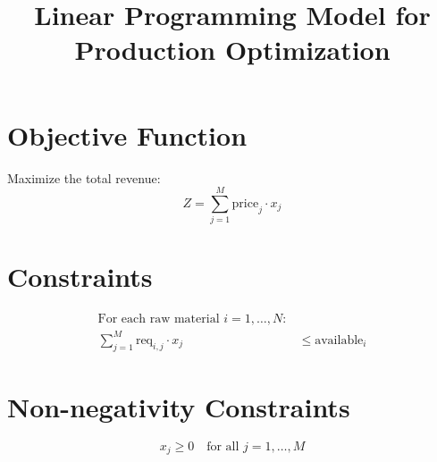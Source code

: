 \documentclass{article}
\begin{document}
\title{Linear Programming Model for Production Optimization}
\author{}
\date{}
\maketitle

\section*{Objective Function}
Maximize the total revenue:
\[
Z = \sum_{j=1}^{M} \text{price}_j \cdot x_j
\]

\section*{Constraints}
\begin{align*}
\text{For each raw material } i = 1, \ldots, N: \\
\sum_{j=1}^{M} \text{req}_{i,j} \cdot x_j &\leq \text{available}_i
\end{align*}

\section*{Non-negativity Constraints}
\[
x_j \geq 0 \quad \text{for all } j = 1, \ldots, M
\]
\end{document}
